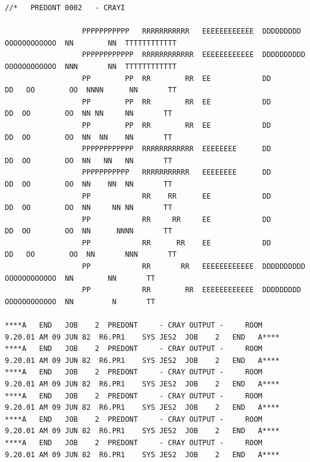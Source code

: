 {\fontsize{5}{6}\selectfont
\begin{verbatim}
//*   PREDONT 0002   - CRAYI

                  PPPPPPPPPPP   RRRRRRRRRRR   EEEEEEEEEEEE  DDDDDDDDD     OOOOOOOOOOOO  NN        NN  TTTTTTTTTTTT
                  PPPPPPPPPPPP  RRRRRRRRRRRR  EEEEEEEEEEEE  DDDDDDDDDD    OOOOOOOOOOOO  NNN       NN  TTTTTTTTTTTT
                  PP        PP  RR        RR  EE            DD       DD   OO        OO  NNNN      NN       TT
                  PP        PP  RR        RR  EE            DD        DD  OO        OO  NN NN     NN       TT
                  PP        PP  RR        RR  EE            DD        DD  OO        OO  NN  NN    NN       TT
                  PPPPPPPPPPPP  RRRRRRRRRRRR  EEEEEEEE      DD        DD  OO        OO  NN   NN   NN       TT
                  PPPPPPPPPPP   RRRRRRRRRRR   EEEEEEEE      DD        DD  OO        OO  NN    NN  NN       TT
                  PP            RR    RR      EE            DD        DD  OO        OO  NN     NN NN       TT
                  PP            RR     RR     EE            DD        DD  OO        OO  NN      NNNN       TT
                  PP            RR      RR    EE            DD       DD   OO        OO  NN       NNN       TT
                  PP            RR       RR   EEEEEEEEEEEE  DDDDDDDDDD    OOOOOOOOOOOO  NN        NN       TT
                  PP            RR        RR  EEEEEEEEEEEE  DDDDDDDDD     OOOOOOOOOOOO  NN         N       TT

****A   END   JOB    2  PREDONT     - CRAY OUTPUT -     ROOM        9.20.01 AM 09 JUN 82  R6.PR1    SYS JES2  JOB    2   END   A****
****A   END   JOB    2  PREDONT     - CRAY OUTPUT -     ROOM        9.20.01 AM 09 JUN 82  R6.PR1    SYS JES2  JOB    2   END   A****
****A   END   JOB    2  PREDONT     - CRAY OUTPUT -     ROOM        9.20.01 AM 09 JUN 82  R6.PR1    SYS JES2  JOB    2   END   A****
****A   END   JOB    2  PREDONT     - CRAY OUTPUT -     ROOM        9.20.01 AM 09 JUN 82  R6.PR1    SYS JES2  JOB    2   END   A****
****A   END   JOB    2  PREDONT     - CRAY OUTPUT -     ROOM        9.20.01 AM 09 JUN 82  R6.PR1    SYS JES2  JOB    2   END   A****
****A   END   JOB    2  PREDONT     - CRAY OUTPUT -     ROOM        9.20.01 AM 09 JUN 82  R6.PR1    SYS JES2  JOB    2   END   A****
\end{verbatim}
}
